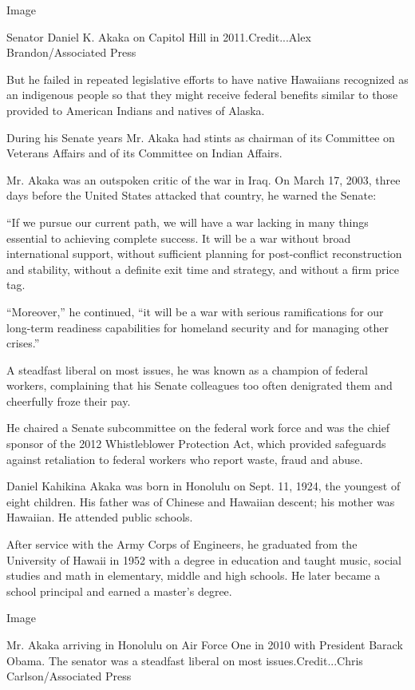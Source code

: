 Image

Senator Daniel K. Akaka on Capitol Hill in 2011.Credit...Alex
Brandon/Associated Press

But he failed in repeated legislative efforts to have native Hawaiians
recognized as an indigenous people so that they might receive federal
benefits similar to those provided to American Indians and natives of
Alaska.

During his Senate years Mr. Akaka had stints as chairman of its
Committee on Veterans Affairs and of its Committee on Indian Affairs.

Mr. Akaka was an outspoken critic of the war in Iraq. On March 17, 2003,
three days before the United States attacked that country, he warned the
Senate:

``If we pursue our current path, we will have a war lacking in many
things essential to achieving complete success. It will be a war without
broad international support, without sufficient planning for
post-conflict reconstruction and stability, without a definite exit time
and strategy, and without a firm price tag.

``Moreover,'' he continued, ``it will be a war with serious
ramifications for our long-term readiness capabilities for homeland
security and for managing other crises.''

A steadfast liberal on most issues, he was known as a champion of
federal workers, complaining that his Senate colleagues too often
denigrated them and cheerfully froze their pay.

He chaired a Senate subcommittee on the federal work force and was the
chief sponsor of the 2012 Whistleblower Protection Act, which provided
safeguards against retaliation to federal workers who report waste,
fraud and abuse.

Daniel Kahikina Akaka was born in Honolulu on Sept. 11, 1924, the
youngest of eight children. His father was of Chinese and Hawaiian
descent; his mother was Hawaiian. He attended public schools.

After service with the Army Corps of Engineers, he graduated from the
University of Hawaii in 1952 with a degree in education and taught
music, social studies and math in elementary, middle and high schools.
He later became a school principal and earned a master's degree.

Image

Mr. Akaka arriving in Honolulu on Air Force One in 2010 with President
Barack Obama. The senator was a steadfast liberal on most
issues.Credit...Chris Carlson/Associated Press

